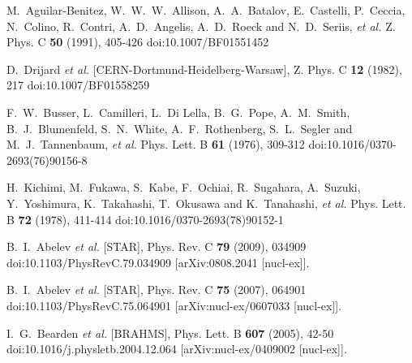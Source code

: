 \begin{thebibliography}{99}
M.~Aguilar-Benitez, W.~W.~W.~Allison, A.~A.~Batalov, E.~Castelli, P.~Ceccia, N.~Colino, R.~Contri, A.~D.~Angelis, A.~D.~Roeck and N.~D.~Seriis, \textit{et al.}
Z. Phys. C \textbf{50} (1991), 405-426
doi:10.1007/BF01551452

D.~Drijard \textit{et al.} [CERN-Dortmund-Heidelberg-Warsaw],
Z. Phys. C \textbf{12} (1982), 217
doi:10.1007/BF01558259

F.~W.~Busser, L.~Camilleri, L.~Di Lella, B.~G.~Pope, A.~M.~Smith, B.~J.~Blumenfeld, S.~N.~White, A.~F.~Rothenberg, S.~L.~Segler and M.~J.~Tannenbaum, \textit{et al.}
Phys. Lett. B \textbf{61} (1976), 309-312
doi:10.1016/0370-2693(76)90156-8

H.~Kichimi, M.~Fukawa, S.~Kabe, F.~Ochiai, R.~Sugahara, A.~Suzuki, Y.~Yoshimura, K.~Takahashi, T.~Okusawa and K.~Tanahashi, \textit{et al.}
Phys. Lett. B \textbf{72} (1978), 411-414
doi:10.1016/0370-2693(78)90152-1

B.~I.~Abelev \textit{et al.} [STAR],
Phys. Rev. C \textbf{79} (2009), 034909
doi:10.1103/PhysRevC.79.034909
[arXiv:0808.2041 [nucl-ex]].

B.~I.~Abelev \textit{et al.} [STAR],
Phys. Rev. C \textbf{75} (2007), 064901
doi:10.1103/PhysRevC.75.064901
[arXiv:nucl-ex/0607033 [nucl-ex]].

I.~G.~Bearden \textit{et al.} [BRAHMS],
Phys. Lett. B \textbf{607} (2005), 42-50
doi:10.1016/j.physletb.2004.12.064
[arXiv:nucl-ex/0409002 [nucl-ex]].


\end{thebibliography}
